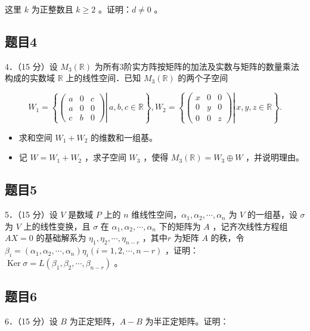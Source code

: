 \documentclass{article}
\begin{document}
这里 \(k\) 为正整数且 \(k \geq 2\) 。证明：\(d \neq 0\) 。

\subsection{题目4}
4．（15 分）设 \(M_{3}(\mathbb{R})\) 为所有3阶实方阵按矩阵的加法及实数与矩阵的数量乘法构成的实数域 \(\mathbb{R}\) 上的线性空间．已知 \(M_{3}(\mathbb{R})\) 的两个子空间

\[
W_{1}=\left\{\left.\left(\begin{array}{ccc}
a & 0 & c \\
a & 0 & 0 \\
c & b & 0
\end{array}\right) \right\rvert\, a, b, c \in \mathbb{R}\right\}, W_{2}=\left\{\left.\left(\begin{array}{ccc}
x & 0 & 0 \\
0 & y & 0 \\
0 & 0 & z
\end{array}\right) \right\rvert\, x, y, z \in \mathbb{R}\right\} .
\]

\begin{itemize}
  \item[（1）] 求和空间 \(W_{1}+W_{2}\) 的维数和一组基。
  \item[（2）] 记 \(W=W_{1}+W_{2}\) ，求子空间 \(W_{3}\) ，使得 \(M_{3}(\mathbb{R})=W_{3} \oplus W\) ，并说明理由。
\end{itemize}

\subsection{题目5}
5．（15 分）设 \(V\) 是数域 \(P\) 上的 \(n\) 维线性空间，\(\alpha_{1}, \alpha_{2}, \cdots, \alpha_{n}\) 为 \(V\) 的一组基，设 \(\sigma\) 为 \(V\) 上的线性变换，且 \(\sigma\) 在 \(\alpha_{1}, \alpha_{2}, \cdots, \alpha_{n}\) 下的矩阵为 \(A\) ，记齐次线性方程组 \(A X=0\) 的基础解系为 \(\eta_{1}, \eta_{2}, \cdots, \eta_{n-r}\) ，其中\(r\) 为矩阵 \(A\) 的秩，令 \(\beta_{i}=\left(\alpha_{1}, \alpha_{2}, \cdots, \alpha_{n}\right) \eta_{i}(i=1,2, \cdots, n-r)\) ，证明： \(\operatorname{Ker} \sigma=L\left(\beta_{1}, \beta_{2}, \cdots, \beta_{n-r}\right)\) 。

\subsection{题目6}
6．（15 分）设 \(B\) 为正定矩阵，\(A-B\) 为半正定矩阵。证明：
\end{document}
